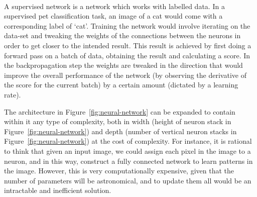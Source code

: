 \documentclass[11pt,twoside]{report}
\begin{document}
\begin{figure}
  \centering
  ~
  \caption{}
\end{figure}

A supervised network is a network which works with labelled data. In a supervised pet classification task, an image of a cat would come with a corresponding label of `cat'. Training the network would involve iterating on the data-set and tweaking the weights of the connections between the neurons in order to get closer to the intended result. This result is achieved by first doing a forward pass on a batch of data, obtaining the result and calculating a score. In the backpropagation step the weights are tweaked in the direction that would improve the overall performance of the network (by observing the derivative of the score for the current batch) by a certain amount (dictated by a learning rate).

The  architecture in Figure~\ref{fig:neural-network} can be expanded to contain within it any type of complexity, both in width (height of neuron stack in Figure~\ref{fig:neural-network}) and depth (number of vertical neuron stacks in Figure~\ref{fig:neural-network}) at the cost of complexity. For instance, it is rational to think that given an input image, we could assign each pixel in the image to a neuron, and in this way, construct a fully connected network to learn patterns in the image. However, this is very computationally expensive, given that the number of parameters will be astronomical, and to update them all would be an intractable and inefficient solution.
\end{document}
